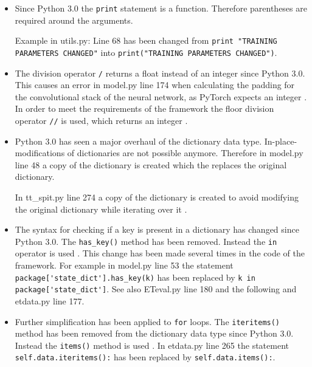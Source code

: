 \documentclass[acmlarge]{acmart}
\begin{document}
\begin{itemize}
    \item Since Python 3.0 the \verb|print| statement is a function. Therefore parentheses are required around the arguments. \cite{van_Rossum_2009}

          Example in utils.py: Line 68 has been changed from \verb|print "TRAINING PARAMETERS CHANGED"| into \verb|print("TRAINING PARAMETERS CHANGED")|.

    \item The division operator \verb|/| returns a float instead of an integer since Python 3.0. This causes an error in model.py line 174 when calculating the padding for the convolutional stack of the neural network, as PyTorch expects an integer \cite{Contributors_2023}. In order to meet the requirements of the framework the floor division operator \verb|//| is used, which returns an integer \cite{van_Rossum_2009}.

    \item Python 3.0 has seen a major overhaul of the dictionary data type. In-place-modifications of dictionaries are not possible anymore. Therefore in model.py line 48 a copy of the dictionary is created which the replaces the original dictionary.

          In tt\_spit.py line 274 a copy of the dictionary is created to avoid modifying the original dictionary while iterating over it \cite{van_Rossum_2009}.

    \item The syntax for checking if a key is present in a dictionary has changed since Python 3.0. The \verb|has_key()| method has been removed. Instead the \verb|in| operator is used \cite{van_Rossum_2009}. This change has been made several times in the code of the framework. For example in model.py line 53 the statement \verb|package['state_dict'].has_key(k)| has been replaced by \verb|k in package['state_dict']|. See also ETeval.py line 180 and the following and etdata.py line 177.

    \item Further simplification has been applied to \verb|for| loops. The \verb|iteritems()| method has been removed from the dictionary data type since Python 3.0. Instead the \verb|items()| method is used \cite{van_Rossum_2009}. In etdata.py line 265 the statement \verb|self.data.iteritems():| has been replaced by \verb|self.data.items():|.

\end{itemize}
\end{document}
